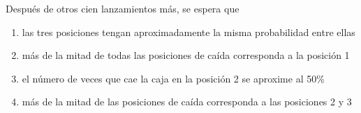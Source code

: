 \documentclass[letterpaper,fleqn]{article}
\begin{document}
\begin{enumerate}
  Después de otros cien lanzamientos más, se espera que
  \begin{enumerate}
    \item las tres posiciones tengan aproximadamente la misma probabilidad entre ellas
    \item más de la mitad de todas las posiciones de caída corresponda a la posición 1
    \item el número de veces que cae la caja en la posición 2 se aproxime al 50\%
     \item más de la mitad de las posiciones de caída corresponda a las posiciones 2 y 3
  \end{enumerate}
\end{enumerate}
\end{document}
